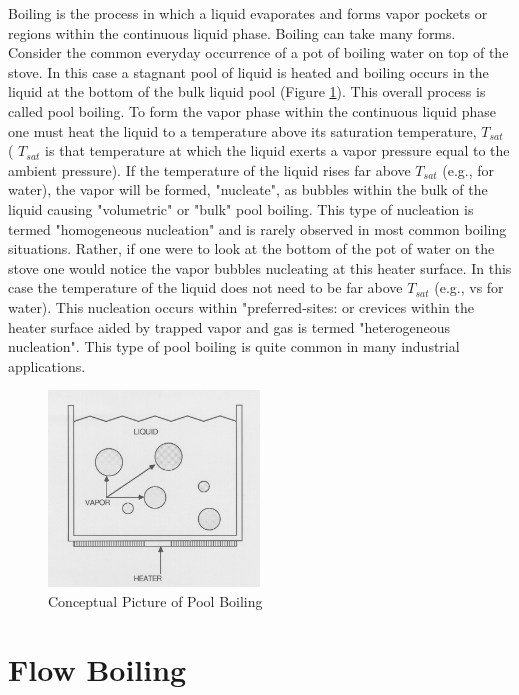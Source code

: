 Boiling is the process in which a liquid evaporates and forms vapor pockets or regions within the continuous liquid phase.
Boiling can take many forms. Consider the common everyday occurrence of a pot of boiling water on top of the stove.
In this case a stagnant pool of liquid is heated and boiling occurs in the liquid at the bottom of the bulk liquid pool (Figure \ref{fig:pool_boiling}).
This overall process is called pool boiling. To form the vapor phase within the continuous liquid phase one must heat the liquid to a temperature above its saturation temperature, $T_{sat}$ ( $T_{sat}$ is that temperature at which the liquid exerts a vapor pressure equal to the ambient pressure).
If the temperature of the liquid rises far above $T_{sat}$ (e.g.,  for water), the vapor will be formed, "nucleate", as bubbles within the bulk of the liquid causing "volumetric" or "bulk" pool boiling.
This type of nucleation is termed "homogeneous nucleation" and is rarely observed in most common boiling situations.
Rather, if one were to look at the bottom of the pot of water on the stove one would notice the vapor bubbles nucleating at this heater surface.
In this case the temperature of the liquid does not need to be far above $T_{sat}$ (e.g.,  vs  for water).
This nucleation occurs within "preferred-sites: or crevices within the heater surface aided by trapped vapor and gas is termed "heterogeneous nucleation".
This type of pool boiling is quite common in many industrial applications.

\begin{figure}[h!]
\includegraphics[width=0.5\textwidth]{images/pool_boiling.png}
\caption{Conceptual Picture of Pool Boiling}
\label{fig:pool_boiling}
\end{figure}

\section{Flow Boiling}

